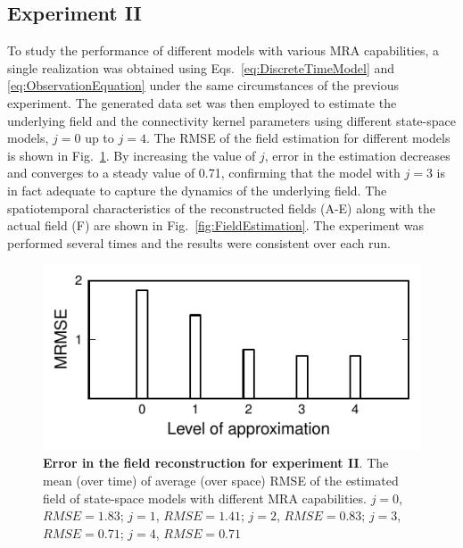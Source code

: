 \documentclass[review,authoryear,3p]{elsarticle}
\begin{document}
\subsection{Experiment II}
To study the performance of different models with various MRA capabilities, a single realization was obtained using Eqs.~\eqref{eq:DiscreteTimeModel} and \eqref{eq:ObservationEquation} under the same circumstances of the previous experiment. The generated data set was then employed to estimate the underlying field and the connectivity kernel parameters using different state-space models, $j=0$ up to $j=4$. The RMSE of the field estimation for different models is shown in Fig.~\ref{fig:RMSE}. By increasing the value of $j$, error in the estimation decreases and converges to a steady value of 0.71, confirming that the model with $j=3$ is in fact adequate to capture the dynamics of the underlying field. The spatiotemporal characteristics of the reconstructed fields (A-E) along with the actual field (F)  are shown in Fig.~\ref{fig:FieldEstimation}. The experiment was performed several times and the results were consistent over each run.
 \begin{figure}[!t]	 
 	\centering
 		\includegraphics[scale=1]{./Graph/fig11.pdf}
 		\caption{{\bf Error in the field reconstruction for experiment II}. The mean (over time) of average (over space) RMSE of the estimated field of state-space models with different MRA capabilities. $j=0$, $RMSE = 1.83$; $j=1$, $RMSE = 1.41$; $j=2$, $RMSE = 0.83$; $j=3$, $RMSE = 0.71$; $j=4$, $RMSE=0.71$}
\label{fig:RMSE}
 \end{figure} 
\end{document}
